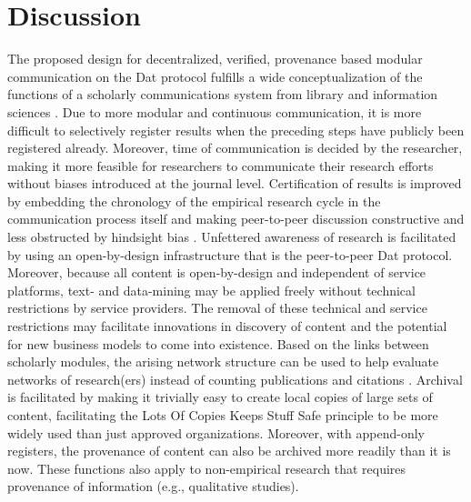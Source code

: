 \documentclass[publications,article,submit,moreauthors,pdftex,10pt,a4paper]{Definitions/mdpi}
\begin{document}
\section*{Discussion}

The proposed design for decentralized, verified, provenance based modular communication on the Dat protocol fulfills a wide conceptualization of the functions of a scholarly communications system from library and information sciences \citep{roosendaal1998,doi:10.1045/september2004-vandesompel}. Due to more modular and continuous communication, it is more difficult to selectively register results when the preceding steps have publicly been registered already. Moreover, time of communication is decided by the researcher, making it more feasible for researchers to communicate their research efforts without biases introduced at the journal level. Certification of results is improved by embedding the chronology of the empirical research cycle in the communication process itself and making peer-to-peer discussion constructive and less obstructed by hindsight bias \citep{doi:10.1037/1089-2680.2.2.175}. Unfettered awareness of research is facilitated by using an open-by-design infrastructure that is the peer-to-peer Dat protocol. Moreover, because all content is open-by-design and independent of service platforms, text- and data-mining may be applied freely without technical restrictions by service providers. The removal of these technical and service restrictions may facilitate innovations in discovery of content and the potential for new business models to come into existence. Based on the links between scholarly modules, the arising network structure can be used to help evaluate networks of research(ers) instead of counting publications and citations \citep{doi:10.3390/publications6020021}.
Archival is facilitated by making it trivially easy to create local copies of large sets of content, facilitating the Lots Of Copies Keeps Stuff Safe \citep[LOCKSS;][]{doi:10.1045/june2001-reich,doi:10.1103/physreve.95.022313} principle to be more widely used than just approved organizations. Moreover, with append-only registers, the provenance of content can also be archived more readily than it is now. These functions also apply to non-empirical research that requires provenance of information (e.g., qualitative studies).
\end{document}
